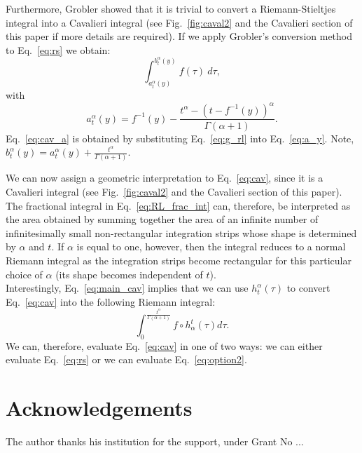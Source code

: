 \documentclass[twoside,reqno,11pt]{fcaa-var} %
\begin{document}
\noindent
Furthermore, Grobler showed that it is trivial to convert a Riemann-Stieltjes integral into a Cavalieri integral \cite{ackermann12,grobler19} (see Fig.~\ref{fig:caval2} and the Cavalieri section of this paper if more details are required). If we apply Grobler's conversion method to Eq.~\eqref{eq:rs} we obtain:
\begin{equation}
\label{eq:cav}
\int_{a_t^{\alpha}(y)}^{b_t^{\alpha}(y)} f(\tau)~d\tau, 
\end{equation}
with
\begin{equation}
\label{eq:cav_a}
a_t^{\alpha}(y) = f^{-1}(y) - \frac{t^{\alpha}-(t-f^{-1}(y))^{\alpha}}{\Gamma(\alpha+1)}.
\end{equation}
Eq.~\eqref{eq:cav_a} is obtained by substituting Eq.~\eqref{eq:g_rl} into Eq.~\eqref{eq:a_y}. Note, $b_t^{\alpha}(y) = a_t^{\alpha}(y) + \frac{t^{\alpha}}{\Gamma(\alpha+1)}$. 

\noindent
We can now assign a geometric interpretation to Eq.~\eqref{eq:cav}, since it is a Cavalieri integral (see Fig.~\ref{fig:caval2} and the Cavalieri section of this paper). The fractional integral in Eq.~\eqref{eq:RL_frac_int} can, therefore, be interpreted as the area obtained 
by summing together the area of an infinite number of infinitesimally small non-rectangular integration strips whose shape is determined by $\alpha$ and $t$. If $\alpha$ is equal to one, however, then the integral reduces to a normal Riemann integral as the integration strips become rectangular for this particular choice of $\alpha$ (its shape becomes independent of $t$).\\

\noindent
Interestingly, Eq.~\eqref{eq:main_cav} implies that we can use $h_t^{\alpha}(\tau)$ to convert Eq.~\eqref{eq:cav} into the following Riemann integral:
\begin{equation}
\label{eq:option2}
\int_0^{\frac{t^{\alpha}}{\Gamma(\alpha+1)}} f\circ h_{\alpha}^t (\tau) d\tau.  
\end{equation}
We can, therefore, evaluate Eq.~\eqref{eq:cav} in one of two ways: we can either evaluate Eq.~\eqref{eq:rs} or we can evaluate Eq.~\eqref{eq:option2}.


 
\section*{Acknowledgements}

 The author thanks his institution for the support, under Grant No ...
\end{document}
